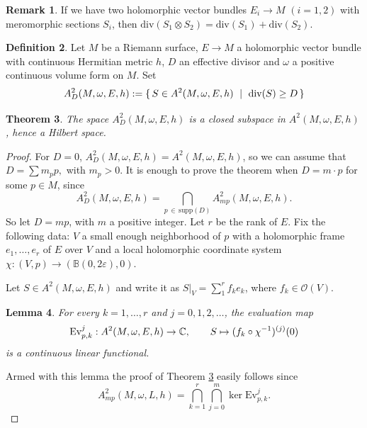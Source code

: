 \documentclass[11pt]{amsart}
\newtheorem{theorem}{Theorem}[section]
\newtheorem{lemma}[theorem]{Lemma}
\theoremstyle{definition}
\newtheorem{definition}[theorem]{Definition}
\newtheorem{remark}[theorem]{Remark}
\newcommand{\bC}{{\mathbb C}}
\begin{document}
 \begin{remark}\label{rem:divtenzor}
 If we have two holomorphic vector bundles $E_i\to M$ $(i=1,2)$ with meromorphic sections $S_i$, then
 $
 \text{div}(S_1\otimes S_2)=\text{div}(S_1)+\text{div}(S_2).
 $
 \end{remark}
 \begin{definition}
 Let $M$ be a Riemann surface, $E\rightarrow M$ a holomorphic vector bundle  with continuous Hermitian metric $h$, $D$ an effective divisor  and $\omega$ a positive continuous volume form on $M$.
 Set 
 $$
A^2_D(M,\omega,E,h):=\{\,S\in A^2(M,\omega,E,h) \ \mid \ \text{\normalfont div}(S)\ge D\, \}
$$
 \end{definition}
\begin{theorem}\label{theorem:embedding}  The space $A^2_D(M,\omega,E,h)$
is a closed subspace in  $A^2(M,\omega,E,h)$, hence a Hilbert space.   
\end{theorem}

\begin{proof}
For $D=0$, $A^2_D(M,\omega,E,h)=A^2(M,\omega,E,h)$, so we can assume that $D=\sum m_pp,$ with $m_p>0$. It is enough to prove the theorem when $D=m\cdot p$ for some $p\in M$, since
  $$
 A^2_D(M,\omega,E,h)=\bigcap_{p\, \in \, \text{supp}(D)}A^2_{mp}(M,\omega,E,h). 
  $$
  So let $D=mp$, with $m$ a positive integer. Let $r$ be the rank of $E$. Fix the following data: $V$  a small enough neighborhood of $p$ with
  a holomorphic frame $e_1,\dots,e_r$ of $E$ over $V$ and a local holomorphic coordinate system
  $\chi:(V,p)\rightarrow (\mathbb{B}(0,2\varepsilon),0)$.
  
  Let $S\in A^2(M,\omega,E,h)$ and write it as $\left.S\right|_V=\sum^r_1f_ke_k$,
  where $f_k\in\mathcal O(V)$.
  \begin{lemma} \label{lem:kiertfolyt} For
  every $k=1,\dots,r$ and $ j=0, 1, 2, \dots$, the  evaluation map
$$\text{\normalfont Ev}^j_{p,k}:A^2(M,\omega,E,h)\rightarrow \bC,
\qquad S\mapsto (f_k\circ\chi^{-1})^{(j)}(0)$$ is a continuous linear functional.
  \end{lemma}

\noindent Armed with this lemma the proof of Theorem \ref{theorem:embedding} easily follows since
$$
A^2_{mp}(M,\omega,L,h)=
\bigcap^r_{k=1}\bigcap^m_{j=0}\ker \text{Ev}^j_{p,k}.
$$
\end{proof}  
\end{document}
